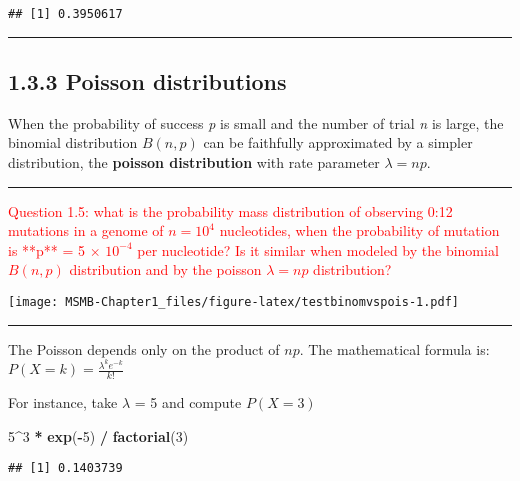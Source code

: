 \documentclass[]{article}
\newenvironment{Shaded}{\begin{snugshade}}{\end{snugshade}}
\newcommand{\KeywordTok}[1]{\textcolor[rgb]{0.13,0.29,0.53}{\textbf{#1}}}
\newcommand{\DecValTok}[1]{\textcolor[rgb]{0.00,0.00,0.81}{#1}}
\newcommand{\StringTok}[1]{\textcolor[rgb]{0.31,0.60,0.02}{#1}}
\newcommand{\OperatorTok}[1]{\textcolor[rgb]{0.81,0.36,0.00}{\textbf{#1}}}
\newcommand{\NormalTok}[1]{#1}
\let\oldrule=\rule
\renewcommand{\rule}[1]{\oldrule{\linewidth}}
\begin{document}
\begin{verbatim}
## [1] 0.3950617
\end{verbatim}

\begin{center}\rule{0.5\linewidth}{\linethickness}\end{center}

\subsection{1.3.3 Poisson distributions}\label{poisson-distributions}

When the probability of success \emph{p} is small and the number of
trial \emph{n} is large, the binomial distribution \(B(n, p)\) can be
faithfully approximated by a simpler distribution, the \textbf{poisson
distribution} with rate parameter \(\lambda = np\).

\begin{center}\rule{0.5\linewidth}{\linethickness}\end{center}

\textcolor{red}{Question 1.5: what is the probability mass distribution of observing 0:12 mutations in a  genome of $n = 10^4$ nucleotides, when the probability of mutation is **p** = 5 $\times$ $10^{-4}$ per nucleotide? Is it similar when modeled by the binomial $B(n, p)$ distribution and by the poisson $\lambda = np$ distribution?}

\texttt{[image: MSMB-Chapter1\_files/figure-latex/testbinomvspois-1.pdf]}

\begin{center}\rule{0.5\linewidth}{\linethickness}\end{center}

The Poisson depends only on the product of \(np\). The mathematical
formula is: \(P(X = k) = \frac{\lambda^ke^{-k}}{k!}\)

For instance, take \(\lambda\) = 5 and compute \(P(X = 3)\)

\begin{Shaded}
\begin{Highlighting}[]
\DecValTok{5}\OperatorTok{^}\DecValTok{3} \OperatorTok{*}\StringTok{ }\KeywordTok{exp}\NormalTok{(}\OperatorTok{-}\DecValTok{5}\NormalTok{) }\OperatorTok{/}\StringTok{ }\KeywordTok{factorial}\NormalTok{(}\DecValTok{3}\NormalTok{)}
\end{Highlighting}
\end{Shaded}

\begin{verbatim}
## [1] 0.1403739
\end{verbatim}
\end{document}
